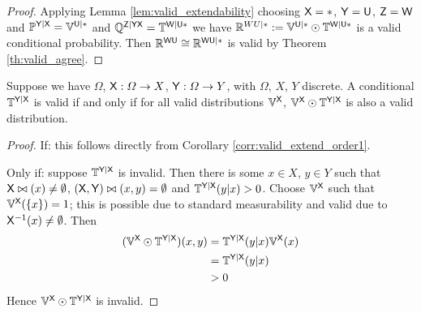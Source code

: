\begin{proof}
Applying Lemma \ref{lem:valid_extendability} choosing $\mathsf{X}=*$, $\mathsf{Y}=\mathsf{U}$, $\mathsf{Z}=\mathsf{W}$ and $\mathbb{P}^{\mathsf{Y}|\mathsf{X}}=\mathbb{V}^{\mathsf{U}|*}$ and $\mathbb{Q}^{\mathsf{Z}|\mathsf{YX}}=\mathbb{T}^{\mathsf{W}|\mathsf{U*}}$ we have $\mathbb{R}^{WU|*}:=\mathbb{V}^{\mathsf{U}|*}\odot \mathbb{T}^{\mathsf{W}|\mathsf{U}*}$ is a valid conditional probability. Then $\mathbb{R}^{\mathsf{WU}}\cong \mathbb{R}^{\mathsf{WU}|*}$ is valid by Theorem \ref{th:valid_agree}.
\end{proof}

\begin{theorem}\label{th:valid_conditional_probability}
Suppose we have $\Omega$, $\mathsf{X}:\Omega\to X$, $\mathsf{Y}:\Omega\to Y$, with $\Omega$, $X$, $Y$ discrete. A conditional $\mathbb{T}^{\mathsf{Y}|\mathsf{X}}$ is valid if and only if for all valid distributions $\mathbb{V}^{\mathsf{X}}$, $\mathbb{V}^{\mathsf{X}}\odot \mathbb{T}^{\mathsf{Y}|\mathsf{X}}$ is also a valid distribution.
\end{theorem}

\begin{proof}
If: this follows directly from Corollary \ref{corr:valid_extend_order1}.

Only if: suppose $\mathbb{T}^{\mathsf{Y}|\mathsf{X}}$ is invalid. Then there is some $x\in X$, $y\in Y$ such that $\mathsf{X}\bowtie(x)\neq \emptyset$, $(\mathsf{X},\mathsf{Y})\bowtie(x,y)=\emptyset$ and $\mathbb{T}^{\mathsf{Y}|\mathsf{X}}(y|x)>0$. Choose $\mathbb{V}^{\mathsf{X}}$ such that $\mathbb{V}^{\mathsf{X}}(\{x\})=1$; this is possible due to standard measurability and valid due to $\mathsf{X}^{-1}(x)\neq \emptyset$. Then
\begin{align}
    (\mathbb{V}^{\mathsf{X}}\odot \mathbb{T}^{\mathsf{Y}|\mathsf{X}})(x,y) &= \mathbb{T}^{\mathsf{Y}|\mathsf{X}}(y|x) \mathbb{V}^{\mathsf{X}}(x)\\
                                                                     &= \mathbb{T}^{\mathsf{Y}|\mathsf{X}}(y|x)\\
                                                                     &>0
\end{align}
Hence $\mathbb{V}^{\mathsf{X}}\odot \mathbb{T}^{\mathsf{Y}|\mathsf{X}}$ is invalid.
\end{proof}


